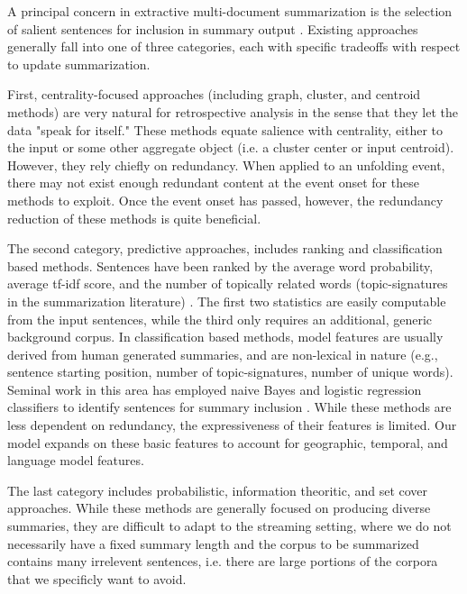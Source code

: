 \label{sec:relatedwork}

A principal concern in extractive multi-document summarization is the
selection of salient sentences for inclusion in summary output
\cite{nenkova2012survey}. 
Existing approaches generally fall into  %
one of three categories, each with specific tradeoffs with respect to update 
summarization. 

First, centrality-focused approaches (including graph,
cluster, and centroid methods) are very natural for retrospective analysis in
the sense that they let the data "speak for itself." 
These methods equate salience with centrality, either to the input or some other
aggregate object (i.e. a cluster center or input centroid).
However, they rely
chiefly on
redundancy. When applied to an unfolding event, there may not exist enough
redundant content at the event onset for these methods to exploit.
Once the event onset has passed, however, the redundancy reduction of these 
methods is quite beneficial.

The second category, predictive approaches,
includes ranking and classification based methods.
Sentences have been ranked by the average word probability, average tf-idf
score, and the number of topically related words (topic-signatures in the
summarization literature)
\cite{nenkova2005impact,hovy1998automated,lin2000automated}. The first two
statistics are easily computable from the input sentences, while the third
only requires an additional, generic background corpus.  
In classification based methods, model features are
usually derived from human generated summaries, and are non-lexical in nature
(e.g., sentence starting position, number of topic-signatures, number of
unique words). Seminal work in this area has employed naive
Bayes and logistic regression classifiers to identify sentences for summary
inclusion \cite{kupiec1995trainable,conroy2001using}. 
While these methods are less dependent on redundancy, the expressiveness of
their features is limited. Our model expands on these basic features to 
account for geographic, temporal, and language model features.

The last category includes probabilistic, information theoritic, and set cover
approaches. While these methods are generally focused on producing diverse
summaries, they are difficult to adapt to the streaming setting, where 
we do not necessarily have a fixed summary length and the corpus to be
summarized contains many irrelevent sentences, i.e. there are large
portions of the corpora that we specificly want to avoid. 




